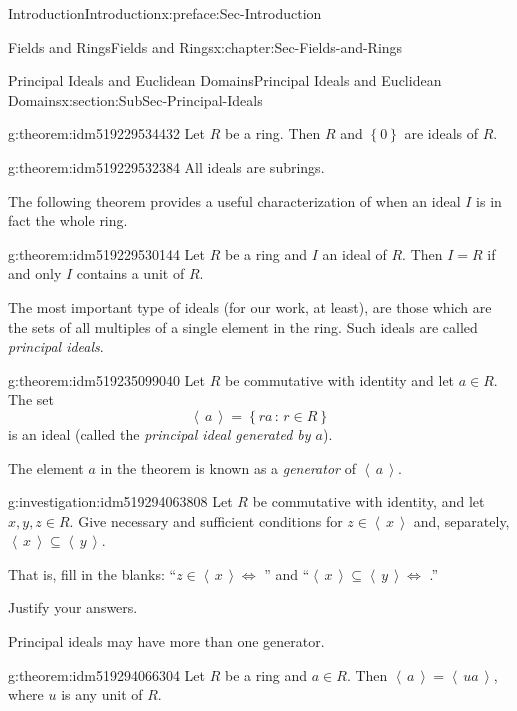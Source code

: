 \documentclass[oneside,10pt,]{book}
\numberwithin{equation}{section}
\newcommand{\ideal}[1]{\left\langle\, #1 \,\right\rangle}
\newcommand{\set}[1]{\left\{ {#1} \right\}}
\newcommand{\setof}[2]{{\left\{#1\,\colon\,#2\right\}}}
\begin{document}
\begin{preface}{Introduction}{}{Introduction}{}{}{x:preface:Sec-Introduction}
\begin{chapterptx}{Fields and Rings}{}{Fields and Rings}{}{}{x:chapter:Sec-Fields-and-Rings}
\begin{sectionptx}{Principal Ideals and Euclidean Domains}{}{Principal Ideals and Euclidean Domains}{}{}{x:section:SubSec-Principal-Ideals}
\begin{theorem}{}{}{g:theorem:idm519229534432}
Let \(R\) be a ring. Then \(R\) and \(\set{0}\) are ideals of \(R\).%
\end{theorem}
\begin{theorem}{}{}{g:theorem:idm519229532384}%
All ideals are subrings.%
\end{theorem}
The following theorem provides a useful characterization of when an ideal \(I\) is in fact the whole ring.%
\begin{theorem}{}{}{g:theorem:idm519229530144}%
Let \(R\) be a ring and \(I\) an ideal of \(R\). Then \(I = R\) if and only \(I\) contains a unit of \(R\).%
\end{theorem}
The most important type of ideals (for our work, at least), are those which are the sets of all multiples of a single element in the ring. Such ideals are called \emph{principal ideals}.%
\begin{theorem}{}{}{g:theorem:idm519235099040}%
Let \(R\) be commutative with identity and let \(a\in R\). The set%
\begin{equation*}
\ideal{a} = \setof{ra}{r\in R}
\end{equation*}
is an ideal (called the \emph{principal ideal generated by \(a\)}).%
\end{theorem}
The element \(a\) in the theorem is known as a \emph{generator} of \(\ideal{a}\).%
\begin{investigation}{}{g:investigation:idm519294063808}%
Let \(R\) be commutative with identity, and let \(x,y,z\in R\). Give necessary and sufficient conditions for \(z\in \ideal{x}\) and, separately, \(\ideal{x} \subseteq \ideal{y}\).%
\par
That is, fill in the blanks: ``\(z\in \ideal{x} \Leftrightarrow\) \textunderscore{}\textunderscore{}\textunderscore{}\textunderscore{}\textunderscore{}\textunderscore{}\textunderscore{}\textunderscore{}\textunderscore{}'' and ``\(\ideal{x}\subseteq \ideal{y} \Leftrightarrow\) \textunderscore{}\textunderscore{}\textunderscore{}\textunderscore{}\textunderscore{}\textunderscore{}\textunderscore{}\textunderscore{}\textunderscore{}.''%
\par
Justify your answers.%
\end{investigation}
Principal ideals may have more than one generator.%
\begin{theorem}{}{}{g:theorem:idm519294066304}%
Let \(R\) be a ring and \(a\in R\). Then \(\ideal{a} = \ideal{ua}\), where \(u\) is any unit of \(R\).%

\end{theorem}
\end{sectionptx}
\end{chapterptx}
\end{preface}
\end{document}
